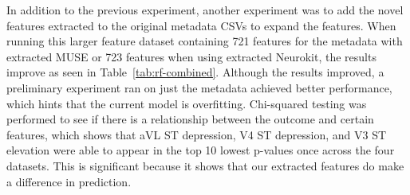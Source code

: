 \documentclass[sigconf,nonacm]{acmart}
\begin{document}
\begin{table}[H]
\centering
\caption{Neurokit and MUSE extracted feature performance.}
\label{tab:rf-neurokit-muse}
\end{table}

In addition to the previous experiment, another experiment was to add the novel features extracted to the original metadata CSVs to expand the features. When running this larger feature dataset containing 721 features for the metadata with extracted MUSE or 723 features when using extracted Neurokit, the results improve as seen in Table~\ref{tab:rf-combined}. Although the results improved, a preliminary experiment ran on just the metadata achieved better performance, which hints that the current model is overfitting. Chi-squared testing was performed to see if there is a relationship between the outcome and certain features, which shows that aVL ST depression, V4 ST depression, and V3 ST elevation were able to appear in the top 10 lowest p-values once across the four datasets. This is significant because it shows that our extracted features do make a difference in prediction.

\begin{table}[H]
\centering
\caption{Neurokit/MUSE + metadata feature performance.}
\label{tab:rf-combined}
\end{table}
\end{document}
